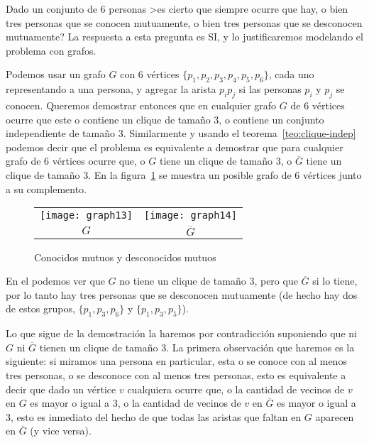 \begin{ejemplo}
Dado un conjunto de 6 personas >es cierto que siempre ocurre que hay, o bien tres personas que se conocen mutuamente, o bien tres personas que se desconocen mutuamente?
La respuesta a esta pregunta es SI, y lo justificaremos  modelando el problema con grafos.

Podemos usar un grafo $G$ con 6 vértices $\{p_1,p_2,p_3,p_4,p_5,p_6\}$, cada uno representando a una persona, y agregar la arista $p_ip_j$ si las personas $p_i$ y $p_j$ se conocen.
Queremos demostrar entonces que en cualquier grafo $G$ de 6 vértices ocurre que este o contiene un clique de tamaño 3, o contiene un conjunto independiente de tamaño 3.
Similarmente y usando el teorema~\ref{teo:clique-indep} podemos decir que el problema es equivalente a demostrar que para cualquier grafo de 6 vértices ocurre que, o $G$ tiene un clique de tamaño 3, o $\overline G$ tiene un clique de tamaño 3.
En la figura~\ref{fig:clique-indep} se muestra un posible grafo de $6$ vértices junto a su complemento.
\begin{figure}[h!]
\centering
\begin{tabular}{cc}
\texttt{[image: graph13]}\hspace*{3em} &  \texttt{[image: graph14]} \\
$G$\hspace*{3em} & $\overline G$
\end{tabular}
\caption{Conocidos mutuos y desconocidos mutuos}
\label{fig:clique-indep}
\end{figure}
En el podemos ver que $G$ no tiene un clique de tamaño 3, pero que $\overline G$ si lo tiene, por lo tanto hay tres personas que se desconocen mutuamente (de hecho hay dos de estos grupos, $\{p_1,p_3,p_6\}$ y $\{p_1,p_3,p_5\}$).

Lo que sigue de la demostración la haremos por contradicción suponiendo que ni $G$ ni $\overline G$ tienen un clique de tamaño 3.
La primera observación que haremos es la siguiente:
si miramos una persona en particular, esta o se conoce con al menos tres personas, o se desconoce con al menos tres personas, esto es equivalente a decir que dado un vértice $v$ cualquiera ocurre que, o la cantidad de vecinos de $v$ en $G$ es mayor o igual a 3, o la cantidad de vecinos de $v$ en $\overline G$ es mayor o igual a 3, esto es inmediato del hecho de que todas las aristas que faltan en $G$ aparecen en $\overline G$ (y vice versa).


\end{ejemplo}
